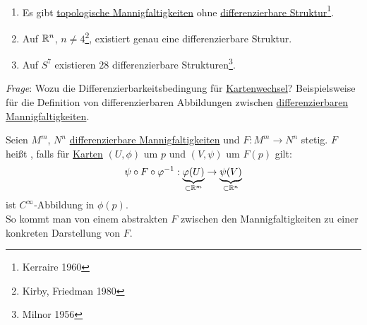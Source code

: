 \begin{remark}
  \
  \begin{enumerate}
    \item Es gibt \hyperref[def:topologischeMannigfaltigkeit]{topologische Mannigfaltigkeiten} ohne \hyperref[def:dbstruktur]{differenzierbare Struktur}\footnote{Kerraire 1960}.
    \item Auf $ \mathbb{R}^n $, $ n \neq 4 $\footnote{Kirby, Friedman 1980}, existiert genau eine differenzierbare Struktur.
    \item Auf $ S^7 $ existieren $ 28 $ differenzierbare Strukturen\footnote{Milnor 1956}.
  \end{enumerate}
  \emph{Frage}: Wozu die Differenzierbarkeitsbedingung für \hyperref[def:kartenwechsel]{Kartenwechsel}? Beispielsweise für die Definition von differenzierbaren Abbildungen zwischen \hyperref[def:dbmannigfaltigkeit]{differenzierbaren Mannigfaltigkeiten}.
\end{remark}


\begin{definition}[Differenzierbarkeit]
  Seien $ M^m $, $ N^n $ \hyperref[def:dbmannigfaltigkeit]{differenzierbare Mannigfaltigkeiten} und $ F: M^m \to N^n $ stetig. $ F $ heißt \label{def:differenzierbar}, falls für \hyperref[def:karte]{Karten} $ (U, \phi) $ um $ p $ und $ (V, \psi) $ um $ F(p) $ gilt:
  \begin{equation*}
    \psi \circ F \circ \varphi^{-1}: \underbrace{\varphi(U)}_{\subset \mathbb{R}^m} \to \underbrace{\psi(V)}_{\subset \mathbb{R}^n}
  \end{equation*}
  ist $ C^\infty $-Abbildung in $ \phi(p) $. \\
  So kommt man von einem abstrakten $ F $ zwischen den Mannigfaltigkeiten zu einer konkreten Darstellung von $ F $.
\end{definition}
